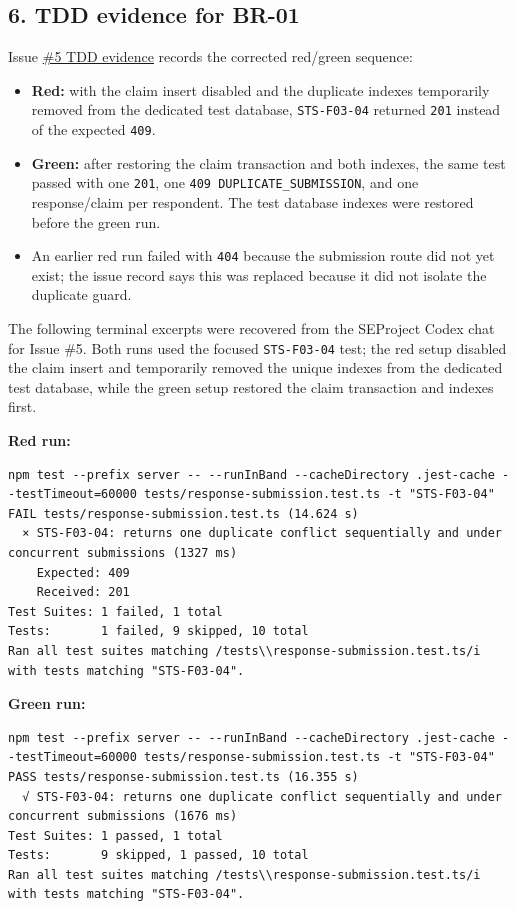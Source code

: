 \documentclass[12pt,a4paper]{article}
\begin{document}
\subsection*{6. TDD evidence for BR-01}
Issue \href{https://github.com/Snnn3/SurveyHub/issues/5\#issuecomment-6767760438}{\#5 TDD evidence} records the corrected red/green sequence:

\begin{itemize}[leftmargin=*]
\item \textbf{Red:} with the claim insert disabled and the duplicate indexes temporarily removed from the dedicated test database, \texttt{STS-F03-04} returned \texttt{201} instead of the expected \texttt{409}.
\item \textbf{Green:} after restoring the claim transaction and both indexes, the same test passed with one \texttt{201}, one \texttt{409 DUPLICATE\_SUBMISSION}, and one response/claim per respondent. The test database indexes were restored before the green run.
\item An earlier red run failed with \texttt{404} because the submission route did not yet exist; the issue record says this was replaced because it did not isolate the duplicate guard.
\end{itemize}

The following terminal excerpts were recovered from the SEProject Codex chat for Issue \#5. Both runs used the focused \texttt{STS-F03-04} test; the red setup disabled the claim insert and temporarily removed the unique indexes from the dedicated test database, while the green setup restored the claim transaction and indexes first.

\textbf{Red run:}
\begin{lstlisting}
npm test --prefix server -- --runInBand --cacheDirectory .jest-cache --testTimeout=60000 tests/response-submission.test.ts -t "STS-F03-04"
FAIL tests/response-submission.test.ts (14.624 s)
  × STS-F03-04: returns one duplicate conflict sequentially and under concurrent submissions (1327 ms)
    Expected: 409
    Received: 201
Test Suites: 1 failed, 1 total
Tests:       1 failed, 9 skipped, 10 total
Ran all test suites matching /tests\\response-submission.test.ts/i with tests matching "STS-F03-04".
\end{lstlisting}

\textbf{Green run:}
\begin{lstlisting}
npm test --prefix server -- --runInBand --cacheDirectory .jest-cache --testTimeout=60000 tests/response-submission.test.ts -t "STS-F03-04"
PASS tests/response-submission.test.ts (16.355 s)
  √ STS-F03-04: returns one duplicate conflict sequentially and under concurrent submissions (1676 ms)
Test Suites: 1 passed, 1 total
Tests:       9 skipped, 1 passed, 10 total
Ran all test suites matching /tests\\response-submission.test.ts/i with tests matching "STS-F03-04".
\end{lstlisting}
\end{document}
